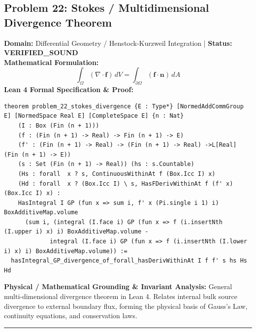 \documentclass[10pt,a4paper]{article}
\begin{document}
\subsection*{Problem 22: Stokes / Multidimensional Divergence Theorem}
\textbf{Domain:} Differential Geometry / Henstock-Kurzweil Integration \quad | \quad \textbf{Status:} \textcolor{green!70!black}{\textbf{VERIFIED\_SOUND}}\\
\textbf{Mathematical Formulation:}
\begin{equation*}
  \int_{\Omega} (\nabla \cdot \mathbf{f})\, dV = \int_{\partial \Omega} (\mathbf{f} \cdot \mathbf{n})\, dA
\end{equation*}
\textbf{Lean 4 Formal Specification \& Proof:}
\begin{lstlisting}
theorem problem_22_stokes_divergence {E : Type*} [NormedAddCommGroup E] [NormedSpace Real E] [CompleteSpace E] {n : Nat} 
    (I : Box (Fin (n + 1)))
    (f : (Fin (n + 1) -> Real) -> Fin (n + 1) -> E)
    (f' : (Fin (n + 1) -> Real) -> (Fin (n + 1) -> Real) ->L[Real] (Fin (n + 1) -> E))
    (s : Set (Fin (n + 1) -> Real)) (hs : s.Countable)
    (Hs : forall  x ? s, ContinuousWithinAt f (Box.Icc I) x)
    (Hd : forall  x ? (Box.Icc I) \ s, HasFDerivWithinAt f (f' x) (Box.Icc I) x) :
    HasIntegral I GP (fun x => sum i, f' x (Pi.single i 1) i) BoxAdditiveMap.volume
      (sum i, (integral (I.face i) GP (fun x => f (i.insertNth (I.upper i) x) i) BoxAdditiveMap.volume -
             integral (I.face i) GP (fun x => f (i.insertNth (I.lower i) x) i) BoxAdditiveMap.volume)) :=
  hasIntegral_GP_divergence_of_forall_hasDerivWithinAt I f f' s hs Hs Hd
\end{lstlisting}
\textbf{Physical / Mathematical Grounding \& Invariant Analysis:}
General multi-dimensional divergence theorem in Lean 4. Relates internal bulk source divergence to external boundary flux, forming the physical basis of Gauss's Law, continuity equations, and conservation laws.
\vspace{0.8em}\hrule\vspace{0.8em}
\end{document}
